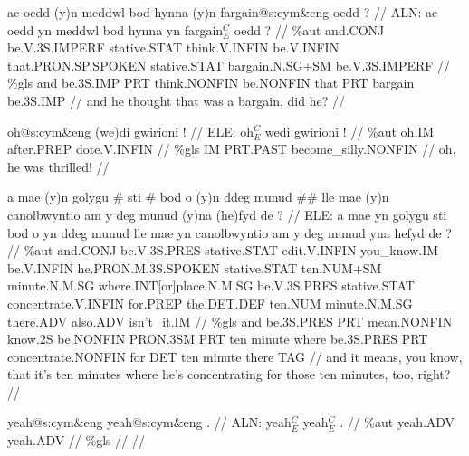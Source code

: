 \documentclass[a4paper,10pt]{article}
\begin{document}
\ex
\begingl[lingstyle=gergl]
\glchat ac oedd (y)n meddwl bod hynna (y)n fargain@s:cym\&eng oedd ? //
\glsurface ALN:  ac oedd yn meddwl bod hynna yn fargain$^{C}_{E}$ oedd ?  //
\glauto \%aut  and{\scriptsize .CONJ} be{\scriptsize .V.3S.IMPERF} stative{\scriptsize .STAT} think{\scriptsize .V.INFIN} be{\scriptsize .V.INFIN} that{\scriptsize .PRON.SP.SPOKEN} stative{\scriptsize .STAT} bargain{\scriptsize .N.SG+SM} be{\scriptsize .V.3S.IMPERF}   //
\glmanual \%gls  and be{\scriptsize .3S.IMP} PRT think{\scriptsize .NONFIN} be{\scriptsize .NONFIN} that PRT bargain be{\scriptsize .3S.IMP}   //
\gleng and he thought that was a bargain, did he? //
\endgl
\xe

\ex
\begingl[lingstyle=gergl]
\glchat oh@s:cym\&eng (we)di gwirioni ! //
\glsurface ELE:  oh$^{C}_{E}$ wedi gwirioni !  //
\glauto \%aut  oh{\scriptsize .IM} after{\scriptsize .PREP} dote{\scriptsize .V.INFIN}   //
\glmanual \%gls  IM PRT{\scriptsize .PAST} become\_silly{\scriptsize .NONFIN}   //
\gleng oh, he was thrilled! //
\endgl
\xe

\ex
\begingl[lingstyle=gergl]
\glchat a mae (y)n golygu \# sti \# bod o (y)n ddeg munud \#\# lle mae (y)n canolbwyntio am y deg munud (y)na (he)fyd de ? //
\glsurface ELE:  a mae yn golygu sti bod o yn ddeg munud lle mae yn canolbwyntio am y deg munud yna hefyd de ?  //
\glauto \%aut  and{\scriptsize .CONJ} be{\scriptsize .V.3S.PRES} stative{\scriptsize .STAT} edit{\scriptsize .V.INFIN} you\_know{\scriptsize .IM} be{\scriptsize .V.INFIN} he{\scriptsize .PRON.M.3S.SPOKEN} stative{\scriptsize .STAT} ten{\scriptsize .NUM+SM} minute{\scriptsize .N.M.SG} where{\scriptsize .INT[or]place.N.M.SG} be{\scriptsize .V.3S.PRES} stative{\scriptsize .STAT} concentrate{\scriptsize .V.INFIN} for{\scriptsize .PREP} the{\scriptsize .DET.DEF} ten{\scriptsize .NUM} minute{\scriptsize .N.M.SG} there{\scriptsize .ADV} also{\scriptsize .ADV} isn't\_it{\scriptsize .IM}   //
\glmanual \%gls  and be{\scriptsize .3S.PRES} PRT mean{\scriptsize .NONFIN} know{\scriptsize .2S} be{\scriptsize .NONFIN} PRON{\scriptsize .3SM} PRT ten minute where be{\scriptsize .3S.PRES} PRT concentrate{\scriptsize .NONFIN} for DET ten minute there TAG    //
\gleng and it means, you know, that it's ten minutes where he's concentrating for those ten minutes, too, right? //
\endgl
\xe

\ex
\begingl[lingstyle=gergl]
\glchat yeah@s:cym\&eng yeah@s:cym\&eng . //
\glsurface ALN:  yeah$^{C}_{E}$ yeah$^{C}_{E}$ .  //
\glauto \%aut  yeah{\scriptsize .ADV} yeah{\scriptsize .ADV}   //
\glmanual \%gls      //
\gleng  //
\endgl
\xe
\end{document}
